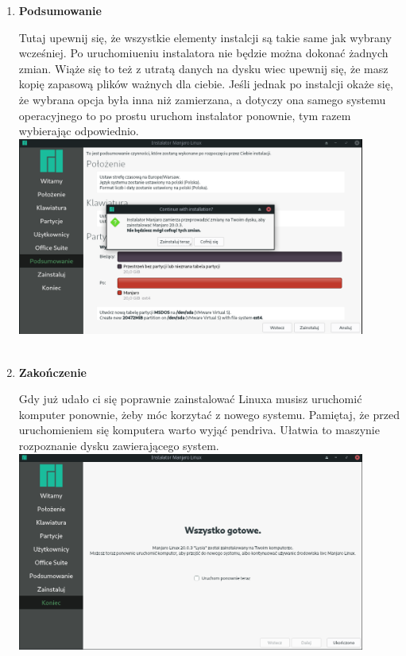 \documentclass[10pt,a4paper]{article}
\begin{document}
\begin{enumerate}
\item \textbf{Podsumowanie} \par
Tutaj upewnij się, że wszystkie elementy instalcji są takie same jak wybrany wcześniej. Po uruchomiueniu instalatora nie będzie można dokonać żadnych zmian. Wiąże się to też z utratą danych na dysku wiec upewnij się, że masz kopię zapasową plików ważnych dla ciebie. Jeśli jednak po instalcji okaże się, że wybrana opcja była inna niż zamierzana, a dotyczy ona samego systemu operacyjnego to po prostu uruchom instalator ponownie, tym razem wybierając odpowiednio.\\

\includegraphics[width=0.9\textwidth, center]{manjaro_install11.png}\\\\

\item \textbf{Zakończenie} \par
Gdy już udało ci się poprawnie zainstalować Linuxa musisz uruchomić komputer ponownie, żeby móc korzytać z nowego systemu. Pamiętaj, że przed uruchomieniem się komputera warto wyjąć pendriva. Ułatwia to maszynie rozpoznanie dysku zawierającego system.\\

\includegraphics[width=0.9\textwidth, center]{manjaro_install13.png}\\\\\\

\end{enumerate}
 
\end{document}
